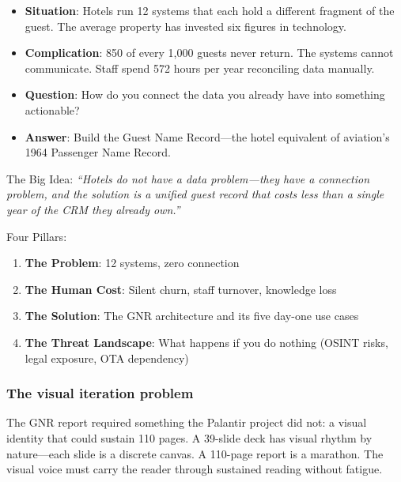 \begin{keybox}
\begin{itemize}[leftmargin=1.2em]
  \item \textbf{Situation}: Hotels run 12 systems that each hold a different fragment of the guest. The average property has invested six figures in technology.
  \item \textbf{Complication}: 850 of every 1,000 guests never return. The systems cannot communicate. Staff spend 572 hours per year reconciling data manually.
  \item \textbf{Question}: How do you connect the data you already have into something actionable?
  \item \textbf{Answer}: Build the Guest Name Record---the hotel equivalent of aviation's 1964 Passenger Name Record.
\end{itemize}
\end{keybox}

The Big Idea: \emph{``Hotels do not have a data problem---they have a connection problem, and the solution is a unified guest record that costs less than a single year of the CRM they already own.''}

Four Pillars:
\begin{enumerate}
  \item \textbf{The Problem}: 12 systems, zero connection
  \item \textbf{The Human Cost}: Silent churn, staff turnover, knowledge loss
  \item \textbf{The Solution}: The GNR architecture and its five day-one use cases
  \item \textbf{The Threat Landscape}: What happens if you do nothing (OSINT risks, legal exposure, OTA dependency)
\end{enumerate}

\subsubsection{The visual iteration problem}

The GNR report required something the Palantir project did not: a visual identity that could sustain 110 pages. A 39-slide deck has visual rhythm by nature---each slide is a discrete canvas. A 110-page report is a marathon. The visual voice must carry the reader through sustained reading without fatigue.

